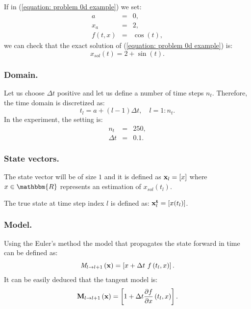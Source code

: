 \documentclass[12pt]{article}
\begin{document}
If in (\ref{equation: problem 0d example}) we set:
\begin{eqnarray}
a & = & 0,
\\
x_a & = & 2,
\\
f( t , x ) & = & \cos ( t ), 
\end{eqnarray}
we can check that the exact solution of (\ref{equation: problem 0d example}) is:
\begin{equation}
x_{sol}( t ) = 2 + \sin ( t ).
\end{equation}

\subsubsection{Domain.}
Let us choose $\Delta t$ positive and let us define a number of time steps $n_t$. Therefore, the time domain is discretized as:
\begin{equation}
t_l = a + \left( l - 1 \right) \Delta t, \quad l = 1 : n_t.
\end{equation}
In the experiment, the setting is:
\begin{eqnarray}
n_t & = & 250,
\\
\Delta t & = & 0{.}1. 
\end{eqnarray}
\subsubsection{State vectors.}
The state vector will be of size $1$ and it is defined as ${\bf x}_l = \left[ x \right]$ where $x \in \mathbbm{R}$ represents an estimation of $x_{sol}(t_l)$. 

The true state at time step index $l$ is defined as: ${\bf x}_l^{\bf t} = \left[ x(t_l) \right]$.

\subsubsection{Model.} 
Using the Euler's method the model that propagates the state forward in time can be defined as:
\begin{equation}
{\it M}_{l \rightarrow l+1} \left( {\bf x} \right) = \left[ x + \Delta t \ f \left( t_l , x \right) \right].
\end{equation}
It can be easily deduced that the tangent model is:
\begin{equation}
{\bf M}_{l \rightarrow l+1} \left( {\bf x} \right) = \left[ 1 + \Delta t \frac{\partial f}{\partial x} \left( t_l , x \right) \right].
\end{equation}
\end{document}
